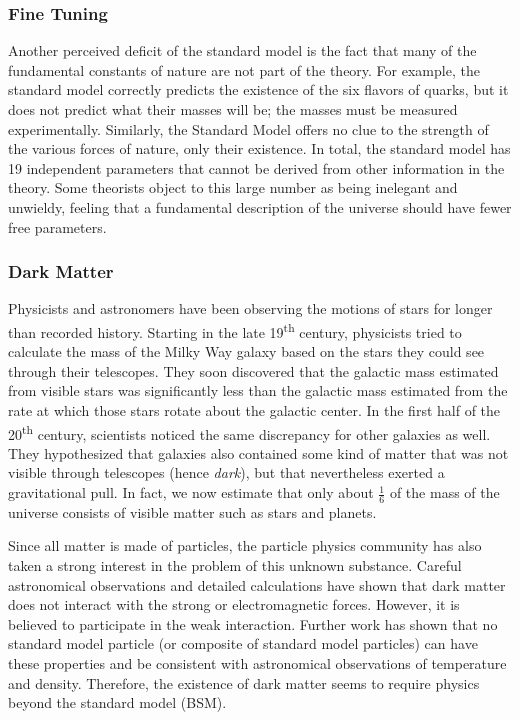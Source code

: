 \subsubsection*{Fine Tuning}
Another perceived deficit of the standard model is the fact that many
of the fundamental constants of nature are not part of the theory. For
example, the standard model correctly predicts the existence of the six
flavors of quarks, but it does not predict what their masses will be;
the masses must be measured experimentally. Similarly, the Standard
Model offers no clue to the strength of the various forces of nature,
only their existence. In total, the standard model has 19 independent
parameters that cannot be derived from other information in the
theory. Some theorists object to this large number as being inelegant
and unwieldy, feeling that a fundamental description of the universe
should have fewer free parameters.

\subsubsection*{Dark Matter}
Physicists and astronomers have been observing the motions of stars
for longer than recorded history. Starting in the late 19\textsuperscript{th}
century, physicists tried to calculate the mass of the Milky Way
galaxy based on the stars they could see through their
telescopes. They soon discovered that the galactic mass estimated from
visible stars was significantly less than the galactic mass
estimated from the rate at which those stars rotate about the
galactic center. In the first half of the 20\textsuperscript{th}
century, scientists noticed the same discrepancy for other galaxies
as well. They hypothesized that galaxies also contained some kind of
matter that was not visible through telescopes (hence \emph{dark}),
but that nevertheless exerted a gravitational pull. In fact, we now
estimate that only about $\frac{1}{6}$ of the mass of the universe consists
of visible matter such as stars and planets. %

Since all matter is made of particles, the particle physics community
has also taken a strong interest in the problem of this unknown
substance. Careful astronomical observations and detailed calculations
have shown that dark matter does not interact with the strong or
electromagnetic forces. %
However, it is believed to participate in the weak interaction. %
Further work has shown that no standard model particle (or composite
of standard model particles) can have these properties and be
consistent with astronomical observations of temperature and %
density. Therefore, the existence of dark matter seems to require
physics beyond the standard model (BSM).

